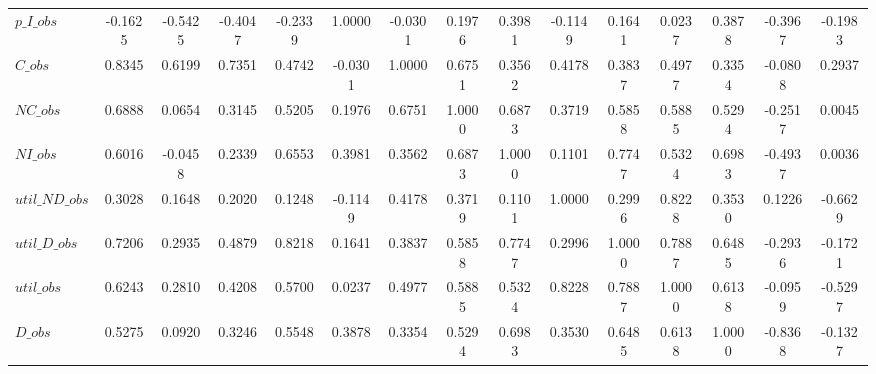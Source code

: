 \begin{center}
\begin{longtable}{lcccccccccccccc}
$p\_I\_obs      $	 & 	          -0.1625	 & 	          -0.5425	 & 	          -0.4047	 & 	          -0.2339	 & 	           1.0000	 & 	          -0.0301	 & 	           0.1976	 & 	           0.3981	 & 	          -0.1149	 & 	           0.1641	 & 	           0.0237	 & 	           0.3878	 & 	          -0.3967	 & 	          -0.1983 \\ 
$C\_obs         $	 & 	           0.8345	 & 	           0.6199	 & 	           0.7351	 & 	           0.4742	 & 	          -0.0301	 & 	           1.0000	 & 	           0.6751	 & 	           0.3562	 & 	           0.4178	 & 	           0.3837	 & 	           0.4977	 & 	           0.3354	 & 	          -0.0808	 & 	           0.2937 \\ 
$NC\_obs        $	 & 	           0.6888	 & 	           0.0654	 & 	           0.3145	 & 	           0.5205	 & 	           0.1976	 & 	           0.6751	 & 	           1.0000	 & 	           0.6873	 & 	           0.3719	 & 	           0.5858	 & 	           0.5885	 & 	           0.5294	 & 	          -0.2517	 & 	           0.0045 \\ 
$NI\_obs        $	 & 	           0.6016	 & 	          -0.0458	 & 	           0.2339	 & 	           0.6553	 & 	           0.3981	 & 	           0.3562	 & 	           0.6873	 & 	           1.0000	 & 	           0.1101	 & 	           0.7747	 & 	           0.5324	 & 	           0.6983	 & 	          -0.4937	 & 	           0.0036 \\ 
$util\_ND\_obs  $	 & 	           0.3028	 & 	           0.1648	 & 	           0.2020	 & 	           0.1248	 & 	          -0.1149	 & 	           0.4178	 & 	           0.3719	 & 	           0.1101	 & 	           1.0000	 & 	           0.2996	 & 	           0.8228	 & 	           0.3530	 & 	           0.1226	 & 	          -0.6629 \\ 
$util\_D\_obs   $	 & 	           0.7206	 & 	           0.2935	 & 	           0.4879	 & 	           0.8218	 & 	           0.1641	 & 	           0.3837	 & 	           0.5858	 & 	           0.7747	 & 	           0.2996	 & 	           1.0000	 & 	           0.7887	 & 	           0.6485	 & 	          -0.2936	 & 	          -0.1721 \\ 
$util\_obs      $	 & 	           0.6243	 & 	           0.2810	 & 	           0.4208	 & 	           0.5700	 & 	           0.0237	 & 	           0.4977	 & 	           0.5885	 & 	           0.5324	 & 	           0.8228	 & 	           0.7887	 & 	           1.0000	 & 	           0.6138	 & 	          -0.0959	 & 	          -0.5297 \\ 
$D\_obs         $	 & 	           0.5275	 & 	           0.0920	 & 	           0.3246	 & 	           0.5548	 & 	           0.3878	 & 	           0.3354	 & 	           0.5294	 & 	           0.6983	 & 	           0.3530	 & 	           0.6485	 & 	           0.6138	 & 	           1.0000	 & 	          -0.8368	 & 	          -0.1327 \\ 

\end{longtable}
\end{center}
